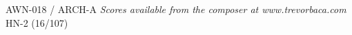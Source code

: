 \documentclass[11pt]{report}
\begin{document}
\null \vfill

AWN-018 / ARCH-A \hfill
\textit{Scores available from the composer at www.trevorbaca.com}
\hfill HN-2 (16/107)
\end{document}
